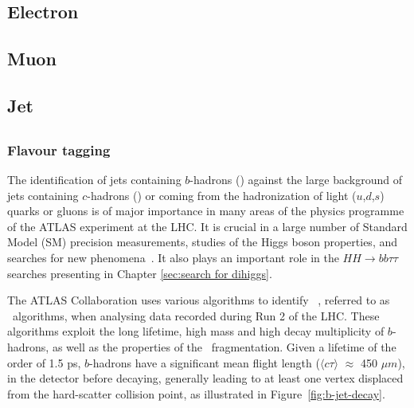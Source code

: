 \documentclass[letterpaper,12pt]{article}
\begin{document}
\subsection{Electron}
\subsection{Muon}
\subsection{Jet}
\subsection{\bjets}


\subsubsection{Flavour tagging}
\label{sec:Flavour tagging}

The identification of jets containing $b$-hadrons (\bjets) 
against the large background of jets containing $c$-hadrons 
(\cjets) or coming from the hadronization of light ($u$,$d$,$s$) 
quarks or gluons is of major importance in many areas of the 
physics programme of the ATLAS experiment at the LHC. 
It is crucial in a large number of Standard Model (SM) 
precision measurements, studies of the Higgs boson properties, and 
searches for new phenomena~\cite{SUSY-2014-08, ATLAS-CONF-2018-043,Interpreting_Higgs_result}.
It also plays an important role in 
the $HH \to bb\tau\tau$ searches presenting in Chapter \ref{sec:search for dihiggs}. 


The ATLAS Collaboration uses various algorithms to identify 
\bjets~\cite{PERF-2012-04}, referred to as \btagging\ algorithms, 
when analysing data recorded during Run 2 of the LHC. These 
algorithms exploit the long lifetime, high mass and high decay 
multiplicity of $b$-hadrons, as well as the properties of the \bquark\  
fragmentation. Given a lifetime of the order of 1.5 ps, $b$-hadrons have a 
significant mean flight length ($\langle c\tau \rangle$ $\approx$ 450 $\mu m$), 
in the detector before decaying, generally leading to at least one vertex 
displaced from the hard-scatter collision point, as illustrated in Figure~\ref{fig:b-jet-decay}.
\end{document}
